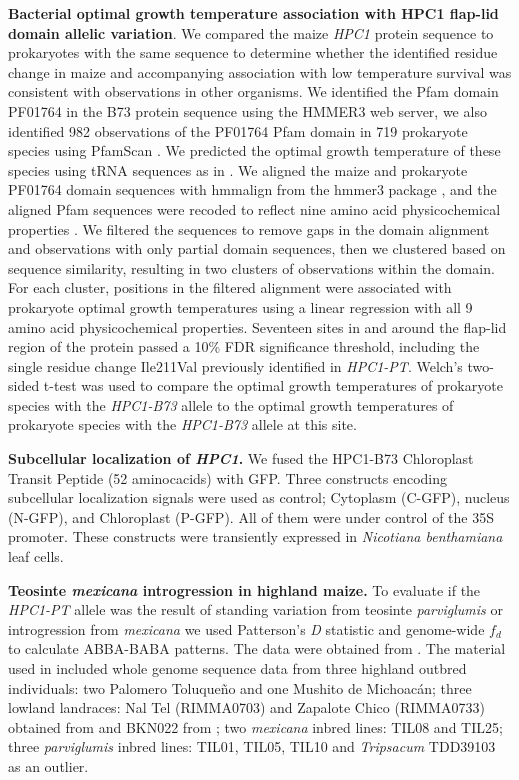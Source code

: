 \documentclass[9pt,twocolumn,twoside,lineno]{BioRxiv}
\begin{document}
\textbf{Bacterial optimal growth temperature association with HPC1 flap-lid domain allelic variation}.
We compared the maize \textit{HPC1} protein sequence to prokaryotes with the same sequence to determine whether the identified residue change in maize and accompanying association with low temperature survival was consistent with observations in other organisms. 
We identified the Pfam domain PF01764 in the B73 protein sequence using the HMMER3 web server, we also identified 982 observations of the PF01764 Pfam domain in 719 prokaryote species using PfamScan \cite{Potter2018-tk, El-Gebali2019-pw}. 
We predicted the optimal growth temperature of these species using tRNA sequences as in \cite{Cimen2020-dm}. 
We aligned the maize and prokaryote PF01764 domain sequences with hmmalign from the hmmer3 package \cite{Eddy2011-pd}, and the aligned Pfam sequences were recoded to reflect nine amino acid physicochemical properties \cite{Li2016-ut}. 
We filtered the sequences to remove gaps in the domain alignment and observations with only partial domain sequences, then we clustered based on sequence similarity, resulting in two clusters of observations within the domain. 
For each cluster, positions in the filtered alignment were associated with prokaryote optimal growth temperatures using a linear regression with all 9 amino acid physicochemical properties. 
Seventeen sites in and around the flap-lid region of the protein passed a 10\% FDR significance threshold, including the single residue change Ile211Val previously identified in \textit{HPC1-PT}. 
Welch’s two-sided t-test was used to compare the optimal growth temperatures of prokaryote species with the \textit{HPC1-B73} allele to the optimal growth temperatures of prokaryote species with the \textit{HPC1-B73} allele at this site.

\textbf{Subcellular localization of \textit{HPC1}.}
We fused the HPC1-B73 Chloroplast Transit Peptide (52 aminocacids) with GFP. %
Three constructs encoding subcellular localization signals were used as control; Cytoplasm (C-GFP), nucleus (N-GFP), and Chloroplast (P-GFP). 
All of them were under control of the 35S promoter. 
These constructs were transiently expressed in \textit{Nicotiana benthamiana} leaf cells.

\textbf{Teosinte \textit{mexicana} introgression in highland maize.}
To evaluate if the \textit{HPC1-PT} allele was the result of standing variation from teosinte \textit{parviglumis} or introgression from \textit{mexicana} we used Patterson's \textit{D} statistic and genome-wide $f_{d}$ to calculate ABBA-BABA patterns. 
The data were obtained from \cite{Gonzalez-Segovia2019-jy}. 
The material used in \cite{Gonzalez-Segovia2019-jy} included whole genome sequence data from three highland outbred individuals: two Palomero Toluqueño and one Mushito de Michoacán; three lowland landraces: Nal Tel (RIMMA0703) and Zapalote Chico (RIMMA0733) obtained from \cite{Wang2017-bc} and  BKN022 from \cite{Bukowski2017-ng}; two \textit{mexicana} inbred lines: TIL08 and TIL25; three \textit{parviglumis} inbred lines: TIL01, TIL05, TIL10 and \textit{Tripsacum} TDD39103 \cite{Bukowski2017-ng} as an outlier. 
\end{document}
